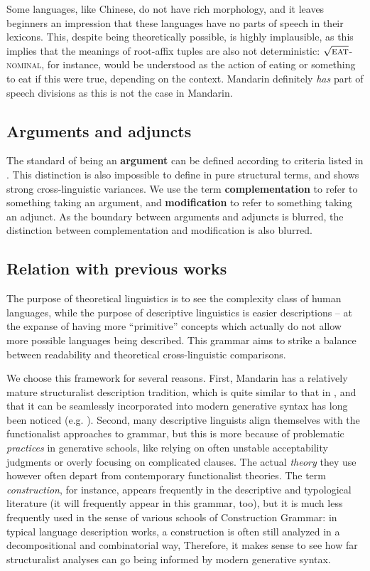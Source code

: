 \documentclass[UTF8, a4paper, oneside, scheme=plain, 12pt]{ctexrep}
\newcommand*{\concept}[1]{\textbf{#1}}
\newcommand*{\term}[1]{\emph{#1}}
\newcommand*{\category}[1]{\textsc{#1}}
\newcommand*{\wordroot}[1]{$\sqrt{\text{\textsc{#1}}}$}
\begin{document}
{Some languages, like Chinese, do not have rich morphology,
and it leaves beginners an impression that these languages have no parts of speech in their lexicons.
This, despite being theoretically possible, is highly implausible,
as this implies that the meanings of root-affix tuples are also not deterministic:
\wordroot{eat}-\category{nominal}, for instance,
would be understood as the action of eating or something to eat if this were true,
depending on the context.
Mandarin definitely \emph{has} part of speech divisions
as this is not the case in Mandarin.

\subsection{Arguments and adjuncts}

The standard of being an \concept{argument} can be defined according to 
criteria listed in .
This distinction is also impossible to define in pure structural terms,
and shows strong cross-linguistic variances.
We use the term \concept{complementation} to refer to something taking an argument,
and \concept{modification} to refer to something taking an adjunct.
As the boundary between arguments and adjuncts is blurred,
the distinction between complementation and modification is also blurred.

\subsection{Relation with previous works}\label{sec:grammatical.previous}

The purpose of theoretical linguistics is to see the complexity class of human languages,
while the purpose of descriptive linguistics is easier descriptions
-- at the expanse of having more ``primitive'' concepts
which actually do not allow more possible languages being described.
This grammar aims to strike a balance between readability and theoretical cross-linguistic comparisons.

We choose this framework for several reasons.
First, Mandarin has a relatively mature structuralist description tradition,
which is quite similar to that in \citet{cgel},
and that it can be seamlessly incorporated into modern generative syntax 
has long been noticed (e.g. \citealt{deng2010formal}).
Second, many descriptive linguists align themselves with the functionalist approaches to grammar,
but this is more because of problematic \emph{practices} in generative schools,
like relying on often unstable acceptability judgments
or overly focusing on complicated clauses.
The actual \emph{theory} they use however often depart from contemporary functionalist theories.
The term \term{construction}, for instance,
appears frequently in the descriptive and typological literature
(it will frequently appear in this grammar, too),
but it is much less frequently used in the sense of various schools of Construction Grammar:
in typical language description works, a construction is often still analyzed 
in a decompositional and combinatorial way,
Therefore, it makes sense to see how far structuralist analyses can go
being informed by modern generative syntax.

}
\end{document}
